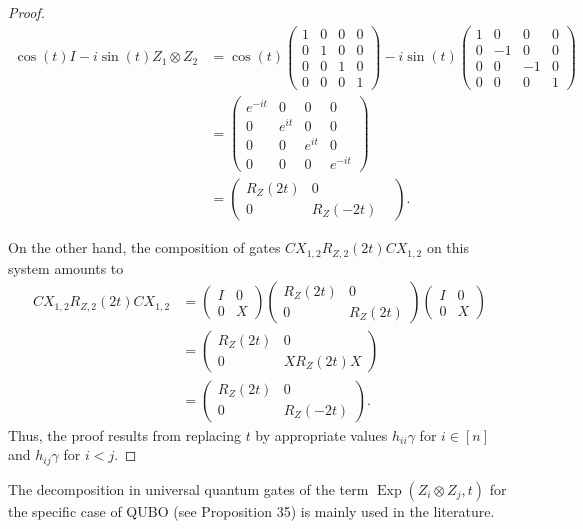 \begin{proof}
\begin{equation}
\begin{aligned}
\cos (t) I-i \sin (t) Z_{1} \otimes Z_{2} & =\cos (t)\left(\begin{array}{llll}
1 & 0 & 0 & 0 \\
0 & 1 & 0 & 0 \\
0 & 0 & 1 & 0 \\
0 & 0 & 0 & 1
\end{array}\right)-i \sin (t)\left(\begin{array}{cccc}
1 & 0 & 0 & 0 \\
0 & -1 & 0 & 0 \\
0 & 0 & -1 & 0 \\
0 & 0 & 0 & 1
\end{array}\right) \\
& =\left(\begin{array}{cccc}
e^{-i t} & 0 & 0 & 0 \\
0 & e^{i t} & 0 & 0 \\
0 & 0 & e^{i t} & 0 \\
0 & 0 & 0 & e^{-i t}
\end{array}\right) \\
& =\left(\begin{array}{ccc}
R_{Z}(2 t) & 0 & \\
0 & R_{Z}(-2 t)
\end{array}\right) .
\end{aligned}
\end{equation}

On the other hand, the composition of gates $C X_{1,2} R_{Z, 2}(2 t) C X_{1,2}$ on this system amounts to
\begin{equation}
\begin{aligned}
C X_{1,2} R_{Z, 2}(2 t) C X_{1,2} & =\left(\begin{array}{cc}
I & 0 \\
0 & X
\end{array}\right)\left(\begin{array}{cc}
R_{Z}(2 t) & 0 \\
0 & R_{Z}(2 t)
\end{array}\right)\left(\begin{array}{ll}
I & 0 \\
0 & X
\end{array}\right) \\
& =\left(\begin{array}{cc}
R_{Z}(2 t) & 0 \\
0 & X R_{Z}(2 t) X
\end{array}\right) \\
& =\left(\begin{array}{cc}
R_{Z}(2 t) & 0 \\
0 & R_{Z}(-2 t)
\end{array}\right) .
\end{aligned}
\end{equation}
Thus, the proof results from replacing $t$ by appropriate values $h_{i i} \gamma$ for $i \in[n]$ and $h_{i j} \gamma$ for $i<j$.
\end{proof}

The decomposition in universal quantum gates of the term $\operatorname{Exp}\left(Z_{i} \otimes Z_{j}, t\right)$ for the specific case of QUBO (see Proposition 35) is mainly used in the literature. 
